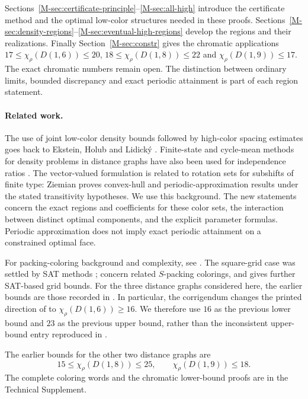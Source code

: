 \documentclass[11pt,reqno]{amsart}
\theoremstyle{plain}
\theoremstyle{plain}
\theoremstyle{plain}
\begin{document}
Sections~\ref{M-sec:certificate-principle}--\ref{M-sec:all-high} introduce the
certificate method and the optimal low-color structures needed in these
proofs. Sections~\ref{M-sec:density-regions}--\ref{M-sec:eventual-high-regions}
develop the regions and their realizations. Finally
Section~\ref{M-sec:constr} gives the chromatic applications
$17\le\chi_\rho(D(1,6))\le20$,
$18\le\chi_\rho(D(1,8))\le22$ and $\chi_\rho(D(1,9))\le17$.
The exact chromatic numbers remain open. The distinction between
ordinary limits, bounded discrepancy and exact periodic attainment
is part of each region statement.

\paragraph{Related work.}
The use of joint low-color density bounds followed by high-color spacing
estimates goes back to Ekstein, Holub and Lidick\'y \cite{M-EHL12}. Finite-state and
cycle-mean methods for density problems in distance graphs have also been
used for independence ratios \cite{M-CGHRS16}. The vector-valued formulation is related
to rotation sets for subshifts of finite type: Ziemian \cite{M-Ziemian95} proves convex-hull
and periodic-approximation results under the stated transitivity hypotheses.
We use this background. The new statements concern the exact regions and
coefficients for these color sets, the interaction between distinct optimal
components, and the explicit parameter formulas. Periodic approximation does
not imply exact periodic attainment on a constrained optimal face.

For packing-coloring background and complexity, see \cite{M-BKR07,M-EHT14,M-FG10,M-FKL09,M-GHHHR08,M-Survey20}. The square-grid
case was settled by SAT methods \cite{M-MRCM17,M-SH23}; \cite{M-BFHJM24,M-EF25} concern related $S$-packing
colorings, and \cite{M-HZZ25} gives further SAT-based grid bounds. For the three distance
graphs considered here, the earlier bounds are those recorded in \cite{M-EHL12,M-Togni14,M-SV15,M-SV16,M-Survey20}.
In particular, the corrigendum \cite{M-SV16} changes the printed direction of \cite[Theorem 1(i)]{M-SV15} to $\chi_\rho(D(1,6))\ge16$. We therefore use $16$ as the
previous lower bound and $23$ as the previous upper bound, rather than the
inconsistent upper-bound entry reproduced in \cite{M-Survey20}.

The earlier bounds for the other two distance graphs are
\cite{M-EHL12,M-Togni14,M-Survey20}
\[
 15\le\chi_\rho(D(1,8))\le25,\qquad \chi_\rho(D(1,9))\le18.
\]
The complete coloring words and the
chromatic lower-bound proofs are in the Technical Supplement.
\end{document}
